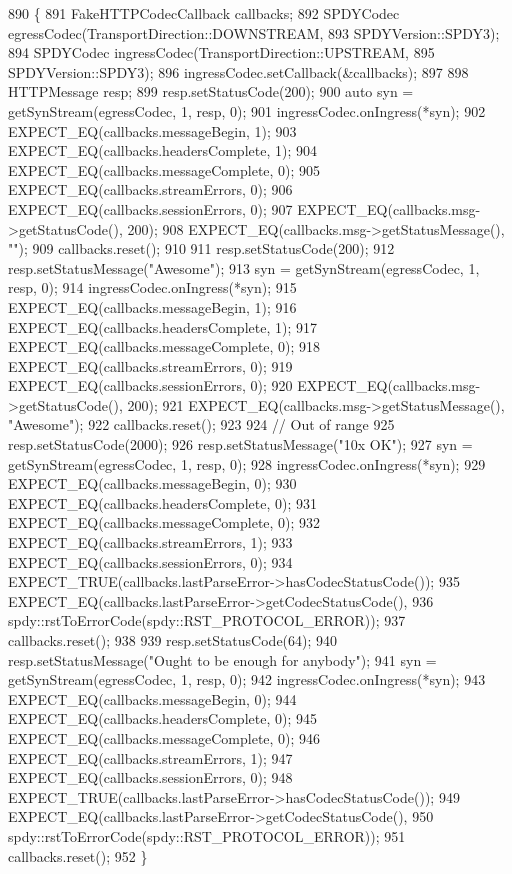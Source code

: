 \begin{DoxyCode}
890                                   \{
891   FakeHTTPCodecCallback callbacks;
892   SPDYCodec egressCodec(TransportDirection::DOWNSTREAM,
893                         SPDYVersion::SPDY3);
894   SPDYCodec ingressCodec(TransportDirection::UPSTREAM,
895                          SPDYVersion::SPDY3);
896   ingressCodec.setCallback(&callbacks);
897 
898   HTTPMessage resp;
899   resp.setStatusCode(200);
900   \textcolor{keyword}{auto} syn = getSynStream(egressCodec, 1, resp, 0);
901   ingressCodec.onIngress(*syn);
902   EXPECT\_EQ(callbacks.messageBegin, 1);
903   EXPECT\_EQ(callbacks.headersComplete, 1);
904   EXPECT\_EQ(callbacks.messageComplete, 0);
905   EXPECT\_EQ(callbacks.streamErrors, 0);
906   EXPECT\_EQ(callbacks.sessionErrors, 0);
907   EXPECT\_EQ(callbacks.msg->getStatusCode(), 200);
908   EXPECT\_EQ(callbacks.msg->getStatusMessage(), \textcolor{stringliteral}{""});
909   callbacks.reset();
910 
911   resp.setStatusCode(200);
912   resp.setStatusMessage(\textcolor{stringliteral}{"Awesome"});
913   syn = getSynStream(egressCodec, 1, resp, 0);
914   ingressCodec.onIngress(*syn);
915   EXPECT\_EQ(callbacks.messageBegin, 1);
916   EXPECT\_EQ(callbacks.headersComplete, 1);
917   EXPECT\_EQ(callbacks.messageComplete, 0);
918   EXPECT\_EQ(callbacks.streamErrors, 0);
919   EXPECT\_EQ(callbacks.sessionErrors, 0);
920   EXPECT\_EQ(callbacks.msg->getStatusCode(), 200);
921   EXPECT\_EQ(callbacks.msg->getStatusMessage(), \textcolor{stringliteral}{"Awesome"});
922   callbacks.reset();
923 
924   \textcolor{comment}{// Out of range}
925   resp.setStatusCode(2000);
926   resp.setStatusMessage(\textcolor{stringliteral}{"10x OK"});
927   syn = getSynStream(egressCodec, 1, resp, 0);
928   ingressCodec.onIngress(*syn);
929   EXPECT\_EQ(callbacks.messageBegin, 0);
930   EXPECT\_EQ(callbacks.headersComplete, 0);
931   EXPECT\_EQ(callbacks.messageComplete, 0);
932   EXPECT\_EQ(callbacks.streamErrors, 1);
933   EXPECT\_EQ(callbacks.sessionErrors, 0);
934   EXPECT\_TRUE(callbacks.lastParseError->hasCodecStatusCode());
935   EXPECT\_EQ(callbacks.lastParseError->getCodecStatusCode(),
936             spdy::rstToErrorCode(spdy::RST_PROTOCOL_ERROR));
937   callbacks.reset();
938 
939   resp.setStatusCode(64);
940   resp.setStatusMessage(\textcolor{stringliteral}{"Ought to be enough for anybody"});
941   syn = getSynStream(egressCodec, 1, resp, 0);
942   ingressCodec.onIngress(*syn);
943   EXPECT\_EQ(callbacks.messageBegin, 0);
944   EXPECT\_EQ(callbacks.headersComplete, 0);
945   EXPECT\_EQ(callbacks.messageComplete, 0);
946   EXPECT\_EQ(callbacks.streamErrors, 1);
947   EXPECT\_EQ(callbacks.sessionErrors, 0);
948   EXPECT\_TRUE(callbacks.lastParseError->hasCodecStatusCode());
949   EXPECT\_EQ(callbacks.lastParseError->getCodecStatusCode(),
950             spdy::rstToErrorCode(spdy::RST_PROTOCOL_ERROR));
951   callbacks.reset();
952 \}
\end{DoxyCode}
